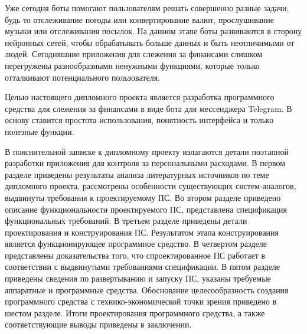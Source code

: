Уже сегодня боты помогают пользователям решать совершенно разные задачи, будь то отслеживание погоды или конвертирование валют, прослушивание музыки или отслеживания посылок. На данном этапе боты развиваются в сторону нейронных сетей, чтобы обрабатывать больше данных и быть неотличимыми от людей. Сегодняшние приложения для слежения за финансами слишком перегружены разнообразными ненужными функциями, которые только отталкивают потенциального пользователя.

Целью настоящего дипломного проекта является разработка программного средства для слежения за финансами в виде бота для мессенджера Telegram. В основу ставится простота использования, понятность интерфейса и только полезные функции.

В пояснительной записке к дипломному проекту излагаются детали поэтапной разработки приложения для контроля за персональными расходами. В первом разделе приведены результаты анализа литературных источников по теме дипломного проекта, рассмотрены особенности существующих систем-аналогов, выдвинуты требования к проектируемому ПС. Во втором разделе приведено описание функциональности проектируемого ПС, представлена спецификация функциональных требований. В третьем разделе приведены детали проектирования и конструирования ПС. Результатом этапа конструирования является функционирующее программное средство. В четвертом разделе представлены доказательства того, что спроектированное ПС работает в соответствии с выдвинутыми требованиями спецификации. В пятом разделе приведены сведения по развертыванию и запуску ПС, указаны требуемые аппаратные и программные средства. Обоснование целесообразность создания программного средства с технико-экономической точки зрения приведено в шестом разделе. Итоги проектирования программного средства, а также соответствующие выводы приведены в заключении.